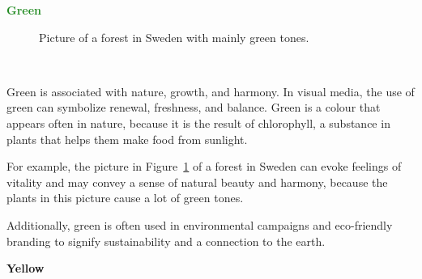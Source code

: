 \documentclass[../MasterThesis.tex]{subfiles}
\begin{document}
\textbf{\textcolor{ForestGreen}{Green}}

%
%
\begin{minipage}{0.5\textwidth}
	\begin{figure}[H]
		\begin{center}
			\label{figure:green}
			\caption[Picture of a forest in Sweden with mainly green tones.]{Picture of a forest in Sweden with mainly green tones.}
		\end{center}
	\end{figure}\hfill
\end{minipage}\begin{minipage}{0.05\textwidth}
	\ 
\end{minipage}\begin{minipage}{0.45\textwidth}
	Green is associated with nature, growth, and harmony. In visual media, the use of green can symbolize renewal, freshness, and balance. Green is a colour that appears often in nature, because it is the result of chlorophyll, a substance in plants that helps them make food from sunlight.~\cite{green}
	
	For example, the picture in Figure~\ref{figure:green} of a forest in Sweden can evoke feelings of vitality  and  may convey a sense of natural beauty and harmony, because the plants in this picture cause a lot of green tones.
	

	
	
\end{minipage}

	\vspace*{-1.4em}

	Additionally, green is often used in environmental campaigns and eco-friendly branding to signify sustainability and a connection to the earth. 








\newpage
\textbf{\textcolor{YellowOrange}{Yellow}}
\end{document}
